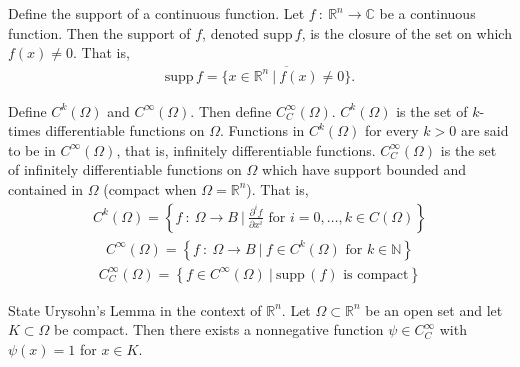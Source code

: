 \documentclass[avery5388,grid,frame]{flashcards}
\newcommand{\supp}{\mathrm{supp}\,}
\newcommand{\f}[3]{#1\ :\ #2 \rightarrow #3}
\def\Rl{\mathbb{R}}
\def\Cx{\mathbb{C}}
\begin{document}


\begin{flashcard}
    {Define the support of a continuous function.}
    Let $\f{f}{\Rl^n}{\Cx}$ be a continuous function.  Then the support of $f$, denoted $\supp f$, is the closure of the set on which $f(x) \neq 0$.  That is,
    \begin{align*}
        \supp f = \overline{\{x \in \Rl^n\ |\ f(x) \neq 0\}}.
    \end{align*}
\end{flashcard}

\begin{flashcard}
    {Define $C^k(\Omega)$ and $C^\infty(\Omega)$.  Then define $C_C^\infty(\Omega)$.}
    $C^k(\Omega)$ is the set of $k$-times differentiable functions on $\Omega$.  Functions in $C^k(\Omega)$ for every $k > 0$ are said to be in $C^\infty(\Omega)$, that is, infinitely differentiable functions.  $C_C^\infty(\Omega)$ is the set of infinitely differentiable functions on $\Omega$ which have support bounded and contained in $\Omega$ (compact when $\Omega = \Rl^n$).  That is,
    \begin{align*}
        C^k(\Omega) = \left\{\f{f}{\Omega}{B}\ |\ \frac{\partial^i f}{\partial x^i} \text{ for } i = 0, \dots, k \in C(\Omega)\right\}
    \end{align*}
    \begin{align*}
        C^\infty(\Omega) = \left\{\f{f}{\Omega}{B}\ |\ f \in C^k(\Omega) \text{ for } k \in \mathbb{N}\right\}
    \end{align*}
    \begin{align*}
        C_C^\infty(\Omega) = \left\{f \in C^\infty(\Omega)\ |\ \supp(f) \text{ is compact} \right\}
    \end{align*}
\end{flashcard}

\begin{flashcard}
    {State Urysohn's Lemma in the context of $\Rl^n$.}
    Let $\Omega \subset \Rl^n$ be an open set and let $K \subset \Omega$ be compact.  Then there exists a nonnegative function $\psi \in C_C^\infty$ with $\psi(x) = 1$ for $x \in K$.
\end{flashcard}
\end{document}
